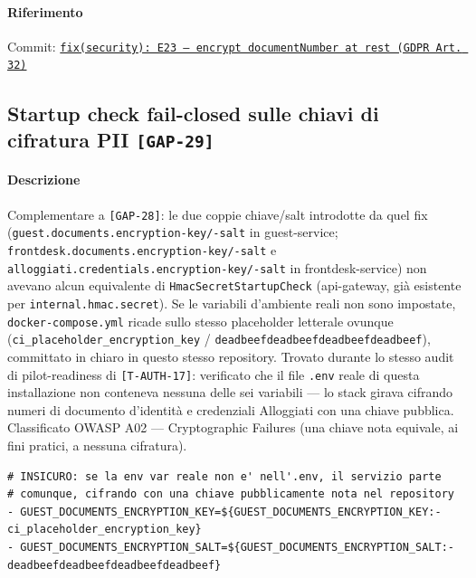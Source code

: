 ﻿\documentclass[a4paper,12pt]{report}
\newcommand{\commitref}[2]{\texttt{\small \href{https://github.com/diegoandruccioli/hotel-pms/commit/#1}{#2}}}
\newcommand{\threat}[1]{\texttt{\small\textcolor{vulnred}{[#1]}}}
\begin{document}
\paragraph{Riferimento} Commit: \commitref{f20c5904}{fix(security): E23 -- encrypt documentNumber at rest (GDPR Art. 32)}

\subsection{Startup check fail-closed sulle chiavi di cifratura PII \threat{GAP-29}}

\paragraph{Descrizione}
Complementare a \threat{GAP-28}: le due coppie chiave/salt introdotte da
quel fix (\texttt{guest.documents.encryption-key/-salt} in guest-service;
\texttt{frontdesk.documents.encryption-key/-salt} e
\texttt{alloggiati.credentials.encryption-key/-salt} in frontdesk-service)
non avevano alcun equivalente di \texttt{HmacSecretStartupCheck}
(api-gateway, già esistente per \texttt{internal.hmac.secret}). Se le
variabili d'ambiente reali non sono impostate, \texttt{docker-compose.yml}
ricade sullo stesso placeholder letterale ovunque
(\texttt{ci\_placeholder\_encryption\_key} /
\texttt{deadbeefdeadbeefdeadbeefdeadbeef}), committato in chiaro in questo
stesso repository. Trovato durante lo stesso audit di pilot-readiness di
\threat{T-AUTH-17}: verificato che il file \texttt{.env} reale di questa
installazione non conteneva nessuna delle sei variabili --- lo stack
girava cifrando numeri di documento d'identità e credenziali Alloggiati
con una chiave pubblica. Classificato OWASP A02 --- Cryptographic
Failures (una chiave nota equivale, ai fini pratici, a nessuna cifratura).

\begin{insecurebox}[title={docker-compose.yml --- fallback a placeholder pubblico (baseline)}]
\begin{lstlisting}[style=yaml]
# INSICURO: se la env var reale non e' nell'.env, il servizio parte
# comunque, cifrando con una chiave pubblicamente nota nel repository
- GUEST_DOCUMENTS_ENCRYPTION_KEY=${GUEST_DOCUMENTS_ENCRYPTION_KEY:-ci_placeholder_encryption_key}
- GUEST_DOCUMENTS_ENCRYPTION_SALT=${GUEST_DOCUMENTS_ENCRYPTION_SALT:-deadbeefdeadbeefdeadbeefdeadbeef}
\end{lstlisting}
\end{insecurebox}
\end{document}
